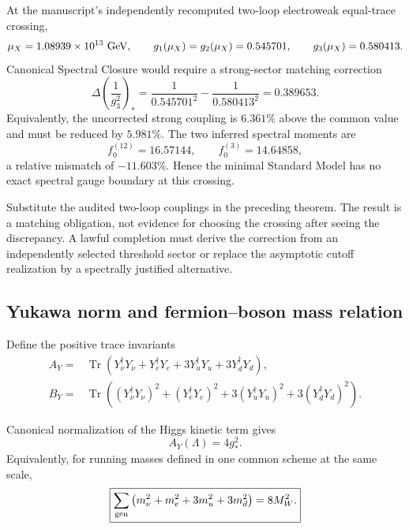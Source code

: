 \begin{proposition}
\label{prop:csc-gauge-threshold}
At the manuscript's independently recomputed two-loop electroweak equal-trace crossing,
\[
 \mu_X=1.08939\times10^{13}\ {\rm GeV},
 \qquad
 g_1(\mu_X)=g_2(\mu_X)=0.545701,
 \qquad
 g_3(\mu_X)=0.580413.
\]
Canonical Spectral Closure would require a strong-sector matching correction
\[
 \boxed{
 \Delta\!\left(\frac1{g_3^2}\right)_*
 =\frac1{0.545701^2}-\frac1{0.580413^2}
 =0.389653.
 }
\]
Equivalently, the uncorrected strong coupling is $6.361\%$ above the common value and must
be reduced by $5.981\%$.  The two inferred spectral moments are
\[
 f_0^{(12)}=16.57144,
 \qquad
 f_0^{(3)}=14.64858,
\]
a relative mismatch of $-11.603\%$.  Hence the minimal Standard Model has no exact
spectral gauge boundary at this crossing.
\end{proposition}

\begin{proofsketch}
Substitute the audited two-loop couplings in the preceding theorem.  The result is a matching
obligation, not evidence for choosing the crossing after seeing the discrepancy.  A lawful
completion must derive the correction from an independently selected threshold sector or
replace the asymptotic cutoff realization by a spectrally justified alternative.
\end{proofsketch}

\subsection{Yukawa norm and fermion--boson mass relation}

Define the positive trace invariants
\[
 \begin{aligned}
 A_Y={}&\operatorname{Tr}\!\left(
 Y_\nu^\dagger Y_\nu+Y_e^\dagger Y_e
 +3Y_u^\dagger Y_u+3Y_d^\dagger Y_d
 \right),\\
 B_Y={}&\operatorname{Tr}\!\left(
 (Y_\nu^\dagger Y_\nu)^2+(Y_e^\dagger Y_e)^2
 +3(Y_u^\dagger Y_u)^2+3(Y_d^\dagger Y_d)^2
 \right).
 \end{aligned}
\]

\begin{theorem}
\label{thm:csc-yukawa-sum}
Canonical normalization of the Higgs kinetic term gives
\[
 \boxed{A_Y(\Lambda)=4g_*^2.}
\]
Equivalently, for running masses defined in one common scheme at the same scale,
\[
 \boxed{
 \sum_{\rm gen}
 \left(m_\nu^2+m_e^2+3m_u^2+3m_d^2\right)
 =8M_W^2.
 }
\]
\end{theorem}


